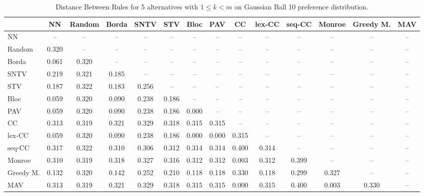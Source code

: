 
\begin{table*}
\centering
\begin{tabular}{lccccccccccccc}
\toprule
 & NN & Random & Borda & SNTV & STV & Bloc & PAV & CC & lex-CC & seq-CC & Monroe & Greedy M. & MAV \\
\midrule
NN & -- & -- & -- & -- & -- & -- & -- & -- & -- & -- & -- & -- & -- \\
Random & 0.320 & -- & -- & -- & -- & -- & -- & -- & -- & -- & -- & -- & -- \\
Borda & 0.061 & 0.320 & -- & -- & -- & -- & -- & -- & -- & -- & -- & -- & -- \\
SNTV & 0.219 & 0.321 & 0.185 & -- & -- & -- & -- & -- & -- & -- & -- & -- & -- \\
STV & 0.187 & 0.322 & 0.183 & 0.256 & -- & -- & -- & -- & -- & -- & -- & -- & -- \\
Bloc & 0.059 & 0.320 & 0.090 & 0.238 & 0.186 & -- & -- & -- & -- & -- & -- & -- & -- \\
PAV & 0.059 & 0.320 & 0.090 & 0.238 & 0.186 & 0.000 & -- & -- & -- & -- & -- & -- & -- \\
CC & 0.313 & 0.319 & 0.321 & 0.329 & 0.318 & 0.315 & 0.315 & -- & -- & -- & -- & -- & -- \\
lex-CC & 0.059 & 0.320 & 0.090 & 0.238 & 0.186 & 0.000 & 0.000 & 0.315 & -- & -- & -- & -- & -- \\
seq-CC & 0.317 & 0.322 & 0.310 & 0.306 & 0.312 & 0.314 & 0.314 & 0.400 & 0.314 & -- & -- & -- & -- \\
Monroe & 0.310 & 0.319 & 0.318 & 0.327 & 0.316 & 0.312 & 0.312 & 0.003 & 0.312 & 0.399 & -- & -- & -- \\
Greedy M. & 0.132 & 0.320 & 0.142 & 0.252 & 0.210 & 0.118 & 0.118 & 0.330 & 0.118 & 0.299 & 0.327 & -- & -- \\
MAV & 0.313 & 0.319 & 0.321 & 0.329 & 0.318 & 0.315 & 0.315 & 0.000 & 0.315 & 0.400 & 0.003 & 0.330 & -- \\
\bottomrule
\end{tabular}

\caption{Distance Between Rules for 5 alternatives with $1 \leq k < m$ on Gaussian Ball 10 preference distribution.}
\end{table*}
